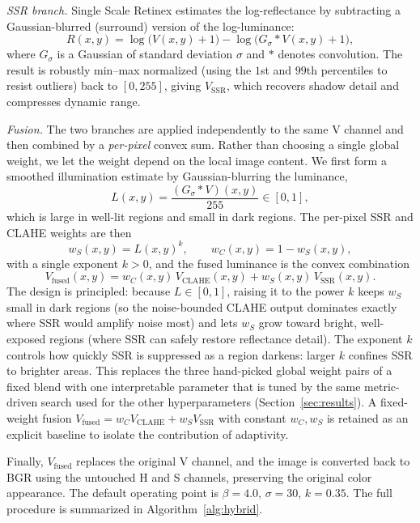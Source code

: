 \documentclass[conference,a4paper]{IEEEtran}
\begin{document}
\emph{SSR branch.} Single Scale Retinex estimates the log-reflectance by
subtracting a Gaussian-blurred (surround) version of the log-luminance:
\begin{equation}
R(x,y) = \log\!\big(V(x,y)+1\big) - \log\!\big(G_\sigma * V (x,y)+1\big),
\end{equation}
where $G_\sigma$ is a Gaussian of standard deviation $\sigma$ and $*$ denotes
convolution. The result is robustly min--max normalized (using the $1$st and
$99$th percentiles to resist outliers) back to $[0,255]$, giving
$V_{\text{SSR}}$, which recovers shadow detail and compresses dynamic range.

\emph{Fusion.} The two branches are applied independently to the same V channel
and then combined by a \emph{per-pixel} convex sum. Rather than choosing a
single global weight, we let the weight depend on the local image content. We
first form a smoothed illumination estimate by Gaussian-blurring the luminance,
\begin{equation}
L(x,y) = \frac{(G_\sigma * V)(x,y)}{255} \in [0,1],
\end{equation}
which is large in well-lit regions and small in dark regions. The per-pixel
SSR and CLAHE weights are then
\begin{equation}
w_S(x,y) = L(x,y)^{k}, \qquad w_C(x,y) = 1 - w_S(x,y),
\end{equation}
with a single exponent $k>0$, and the fused luminance is the convex combination
\begin{equation}
V_{\text{fused}}(x,y) = w_C(x,y)\,V_{\text{CLAHE}}(x,y)
                       + w_S(x,y)\,V_{\text{SSR}}(x,y).
\end{equation}
The design is principled: because $L\in[0,1]$, raising it to the power $k$ keeps
$w_S$ small in dark regions (so the noise-bounded CLAHE output dominates exactly
where SSR would amplify noise most) and lets $w_S$ grow toward bright,
well-exposed regions (where SSR can safely restore reflectance detail). The
exponent $k$ controls how quickly SSR is suppressed as a region darkens: larger
$k$ confines SSR to brighter areas. This replaces the three hand-picked global
weight pairs of a fixed blend with one interpretable parameter that is tuned by
the same metric-driven search used for the other hyperparameters
(Section~\ref{sec:results}). A fixed-weight fusion $V_{\text{fused}} =
w_C V_{\text{CLAHE}} + w_S V_{\text{SSR}}$ with constant $w_C,w_S$ is retained as
an explicit baseline to isolate the contribution of adaptivity.

Finally, $V_{\text{fused}}$ replaces the original V channel, and the image is
converted back to BGR using the untouched H and S channels, preserving the
original color appearance. The default operating point is $\beta=4.0$,
$\sigma=30$, $k=0.35$. The full procedure is summarized in
Algorithm~\ref{alg:hybrid}.
\end{document}

